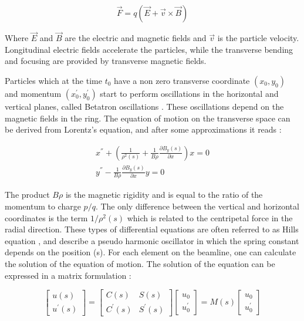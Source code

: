 \begin{equation}
    \vec{F} = q \left( \vec{E} + \vec{v} \times  \vec{B}\right)
    \label{eq:LorentzLaw}
\end{equation}

Where $\vec{E}$ and $\vec{B}$ are the electric and magnetic fields and $\vec{v}$ is the particle velocity. Longitudinal electric fields accelerate the particles, while the transverse bending and focusing are provided by transverse magnetic fields. 

Particles which at the time $t_0$ have a non zero transverse coordinate $\left(x_0 , y_0 \right)$ and momentum $\left(x_{0}^{'} , y_{0}^{'} \right)$ start to perform oscillations in the horizontal and vertical planes,  called Betatron oscillations \parencite*[][]{ref:BookAccPhysics2}. These oscillations depend on the magnetic fields in the ring. The equation of motion on the transverse space can be derived from Lorentz's equation, and after some approximations it reads \parencite*[][]{ref:ApproxEqMotion}:

\begin{equation}
    \begin{aligned}
        x^{''} + \left(\frac{1}{\rho^{2}(s)}+\frac{1}{B\rho}\frac{\partial B_y(s)}{\partial x} \right)  x = 0 \\
        y^{''} - \frac{1}{B \rho}\frac{\partial B_y (s)}{\partial x}  y = 0
    \end{aligned}
    \label{eq:EqMotion}
\end{equation}


The product $B \rho$ is the magnetic rigidity and is equal to the ratio of the momentum to charge $p/q$. The only difference between the vertical and horizontal coordinates is the term $1/\rho^2(s)$ which is related to the centripetal force in the radial direction. These types of differential equations are often referred to as Hills equation \parencite*[][]{ref:HillEquation}, and describe a pseudo harmonic oscillator in which the spring constant depends on the position (s). For each element on the beamline, one can calculate the solution of the equation of motion. The solution of the equation can be expressed in a matrix formulation \parencite*[][]{ref:MatrixForm}:

\begin{equation}
    \begin{bmatrix}
        u(s) \\ u^{'}(s) 
   \end{bmatrix}
   = 
   \begin{bmatrix}
        C(s) & S(s) \\ C^{'}(s)  & S^{'}(s)
   \end{bmatrix}
   \begin{bmatrix}
        u_0 \\ u^{'}_0
   \end{bmatrix}
   =
   M(s) 
   \begin{bmatrix}
        u_0 \\ u^{'}_0
   \end{bmatrix}
\end{equation}

